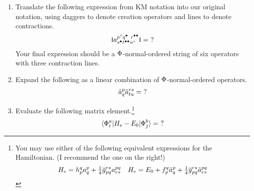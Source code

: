 \documentclass[11pt]{article}
\numberwithin{equation}{section}
\begin{document}
\begin{enumerate}
\item
  Translate the following expression from KM notation into our original notation, using daggers to denote creation operators and lines to denote contractions.
\begin{align*}
  \gno{
    a^{p^\hole q^{\ptcl\phantom{\ptcl}} r^{\ptcl\ptcl}}
     _{s^\ptcl t^{\ptcl\ptcl} u^\hole}
  }
=
  \,\,?
\end{align*}
  Your final expression should be a $\Phi $-normal-ordered string of six operators with three contraction lines.

\newpage
\item
Expand the following as a linear combination of $\Phi $-normal-ordered operators.
\begin{align*}
  \tilde{a}^p_q
  \tilde{a}^{rs}_{tu}
=
  \,\,?
\end{align*}


\newpage
\item
Evaluate the following matrix element.\footnote{You may use either of the following equivalent expressions for the Hamiltonian. (I recommend the one on the right!)
\begin{align*}
  H_e
=
  h_p^q
  a^p_q
+
  \tfrac{1}{4}
  \overline{g}_{pq}^{rs}
  a^{pq}_{rs}
&&
  H_e
=
  E_0
+
  f_p^q
  \tilde{a}^p_q
+
  \tfrac{1}{4}
  \overline{g}_{pq}^{rs}
  \tilde{a}^{pq}_{rs}
\end{align*}
}
\begin{align*}
  \langle\Phi _i^a|H_e - E_0|\Phi _j^b\rangle
=
  \,\,?
\end{align*}
\end{enumerate}
\end{document}
